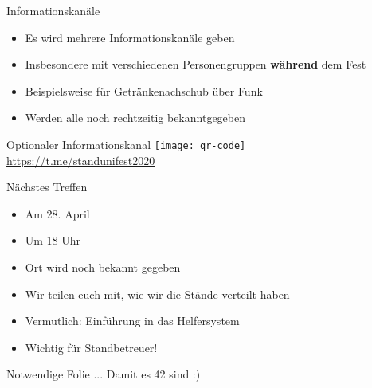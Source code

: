 \begin{frame}[c]{Informationskanäle}
    \begin{itemize}[<+(1)->]
        \item Es wird mehrere Informationskanäle geben
        \item Insbesondere mit verschiedenen Personengruppen \textbf{während} dem Fest
        \item Beispielsweise für Getränkenachschub über Funk
        \item Werden alle noch rechtzeitig bekanntgegeben
    \end{itemize}
\end{frame}


\begin{frame}[c]{Optionaler Informationskanal}
    \texttt{[image: qr-code]} \\
    \url{https://t.me/standunifest2020}
\end{frame}




\begin{frame}[c]{Nächstes Treffen}
    \begin{itemize}[<+(1)->]
        \item Am 28. April
        \item Um 18 Uhr
        \item Ort wird noch bekannt gegeben
        \item Wir teilen euch mit, wie wir die Stände verteilt haben
        \item Vermutlich: Einführung in das Helfersystem
        \item<handout> Wichtig für Standbetreuer!
    \end{itemize}
\end{frame}


\begin{frame}[c]{Notwendige Folie}
    ... Damit es 42 sind :)
\end{frame}


